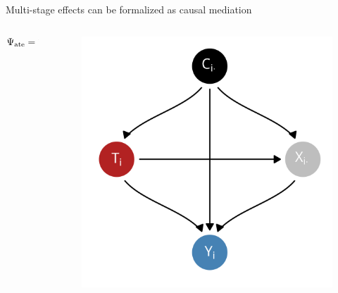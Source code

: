 \documentclass[aspectratio=169]{beamer}
\theoremstyle{remark}
\begin{document}
\begin{frame}{Multi-stage effects can be formalized as causal mediation}
\begin{columns}
\begin{column}{0.67 \textwidth}
            \begin{equation*}
                \Psi_\mathrm{ate} = \Psi_\mathrm{nde} + \Psi_\mathrm{nie}
            \end{equation*}
        \end{column}
        \begin{column}{0.32 \textwidth}
            \centering
            \begin{figure}[ht]
                \includegraphics[width=\textwidth]{figures/dags/mediating.png}
            \end{figure}
        \end{column}
    \end{columns}
\end{frame}
\end{document}
